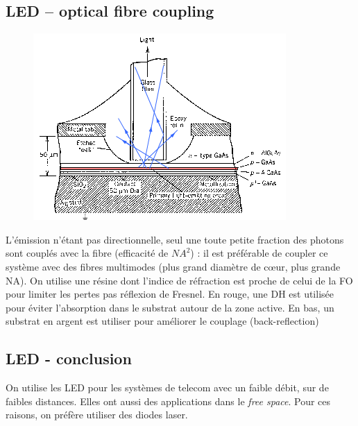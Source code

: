 \newpage
\subsection{LED – optical fibre coupling}
	\begin{figure}
	\vspace{-5mm}
	\includegraphics[scale=0.5]{ch4/image10}
	\end{figure}
L'émission n'étant pas directionnelle, seul une toute petite fraction des photons sont couplés avec la
fibre (efficacité de $NA^2$) : il est préférable de coupler ce système avec des fibres multimodes 
(plus grand diamètre de cœur, plus grande NA). On utilise une résine dont l'indice de réfraction est
proche de celui de la FO pour limiter les pertes pas réflexion de Fresnel. En rouge, une DH est utilisée
pour éviter l'absorption dans le substrat autour de la zone active. En bas, un substrat en argent est
utiliser pour améliorer le couplage (back-reflection)


\subsection{LED - conclusion}
On utilise les LED pour les systèmes de telecom avec un faible débit, sur de faibles distances. Elles
ont aussi des applications dans le \textit{free space}. Pour ces raisons, on préfère utiliser des 
diodes laser.



